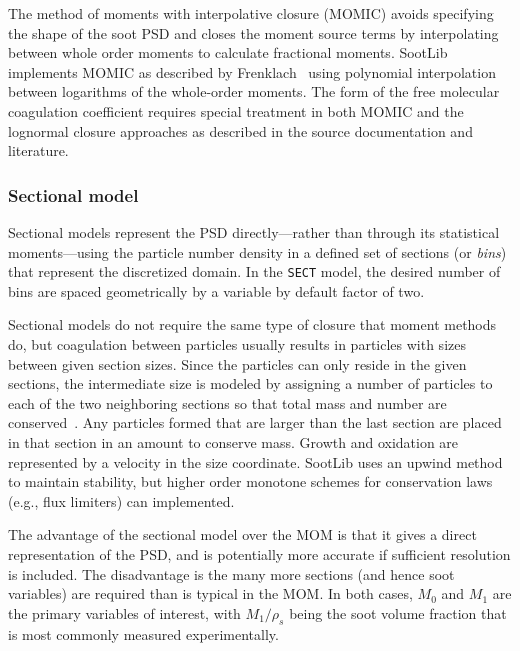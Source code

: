 \documentclass[preprint,letterpaper]{elsarticle}
\begin{document}
The method of moments with interpolative closure (MOMIC) avoids specifying the shape of the soot PSD and closes the moment source terms by interpolating between whole order moments to calculate fractional moments. 
SootLib implements MOMIC as described by Frenklach~\cite{Frenklach_2002b,Frenklach_1987}
using polynomial interpolation between logarithms of the whole-order moments. The form of the free molecular coagulation coefficient requires special treatment in both MOMIC and the lognormal closure approaches as described in the source documentation and literature.


\subsubsection{Sectional model}
\label{s:sectional}

Sectional models represent the PSD directly---rather than through its statistical moments---using the particle number density in a defined set of sections (or \emph{bins}) that represent the discretized domain. In the \texttt{SECT} model, the desired number of bins are spaced geometrically by a variable by default factor of two.

Sectional models do not require the same type of closure that moment methods do, but coagulation between particles usually results in particles with sizes between given section sizes. Since the particles can only reside in the given sections, the intermediate size is modeled by assigning a number of particles to each of the two neighboring sections so that total mass and number are conserved~\cite{Lehtinen_2001}. Any particles formed that are larger than the last section are placed in that section in an amount to conserve mass. Growth and oxidation are represented by a velocity in the size coordinate. SootLib uses an upwind method to maintain stability, but higher order monotone schemes for conservation laws (e.g., flux limiters) can implemented.

The advantage of the sectional model over the MOM is that it gives a direct representation of the PSD, and is potentially more accurate if sufficient resolution is included. The disadvantage is the many more sections (and hence soot variables) are required than is typical in the MOM. In both cases, $M_0$ and $M_1$ are the primary variables of interest, with $M_1/\rho_s$ being the soot volume fraction that is most commonly measured experimentally.
\end{document}
